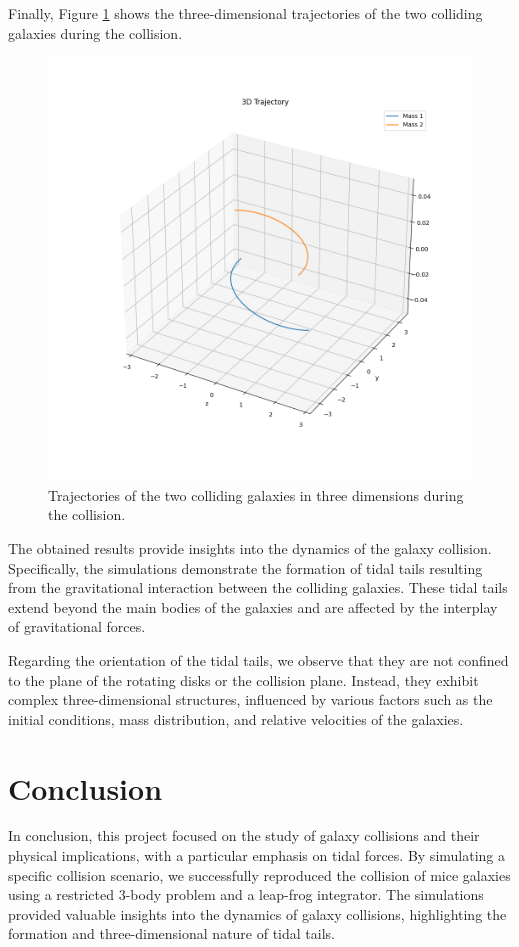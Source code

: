 \documentclass[reprint, amsmath, amssymb, aps]{revtex4-2}
\begin{document}
Finally, Figure \ref{fig:collision} shows the three-dimensional trajectories of the two colliding galaxies during the collision.

\begin{figure}[htb]
    \centering
    \includegraphics[width=0.7\columnwidth]{figures/4.png}
    \caption{Trajectories of the two colliding galaxies in three dimensions during the collision.}
    \label{fig:collision}
\end{figure}

The obtained results provide insights into the dynamics of the galaxy collision. Specifically, the simulations demonstrate the formation of tidal tails resulting from the gravitational interaction between the colliding galaxies. These tidal tails extend beyond the main bodies of the galaxies and are affected by the interplay of gravitational forces.

Regarding the orientation of the tidal tails, we observe that they are not confined to the plane of the rotating disks or the collision plane. Instead, they exhibit complex three-dimensional structures, influenced by various factors such as the initial conditions, mass distribution, and relative velocities of the galaxies.

\section{Conclusion}

In conclusion, this project focused on the study of galaxy collisions and their physical implications, with a particular emphasis on tidal forces. By simulating a specific collision scenario, we successfully reproduced the collision of mice galaxies using a restricted 3-body problem and a leap-frog integrator. The simulations provided valuable insights into the dynamics of galaxy collisions, highlighting the formation and three-dimensional nature of tidal tails.
\end{document}
